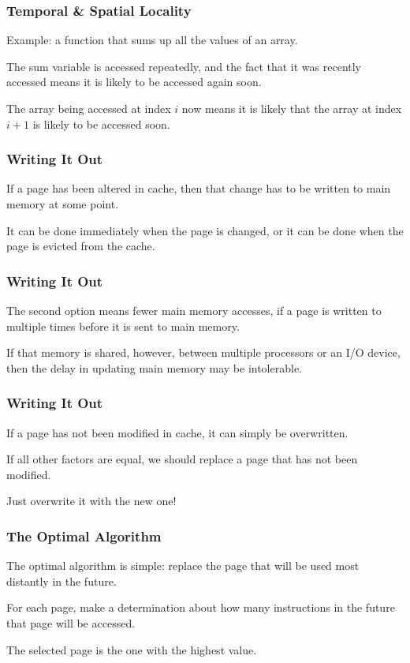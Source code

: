 \begin{frame}
\frametitle{Temporal \& Spatial Locality}

Example: a function that sums up all the values of an array. 

The sum variable is accessed repeatedly, and the fact that it was recently accessed means it is likely to be accessed again soon. 

The array being accessed at index $i$ now means it is likely that the array at index $i+1$ is likely to be accessed soon.

\end{frame}

\begin{frame}
\frametitle{Writing It Out}

If a page has been altered in cache, then that change has to be written to main memory at some point. 

It can be done immediately when the page is changed, or it can be done when the page is evicted from the cache. 

\end{frame}

\begin{frame}
\frametitle{Writing It Out}

The second option means fewer main memory accesses, if a page is written to multiple times before it is sent to main memory.

If that memory is shared, however, between multiple processors or an I/O device, then the delay in updating main memory may be intolerable. 

\end{frame}

\begin{frame}
\frametitle{Writing It Out}


If a page has not been modified in cache, it can simply be overwritten. 

If all other factors are equal, we should replace a page that has not been modified.

Just overwrite it with the new one!

\end{frame}

\begin{frame}
\frametitle{The Optimal Algorithm}

The optimal algorithm is simple: replace the page that will be used most distantly in the future. 

For each page, make a determination about how many instructions in the future that page will be accessed. 

The selected page is the one with the highest value.


\end{frame}

